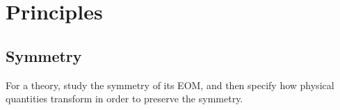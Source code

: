 \section{Principles}
\subsection{Symmetry}
For a theory, study the symmetry of its EOM, and then specify how physical quantities transform 
in order to preserve the symmetry.

